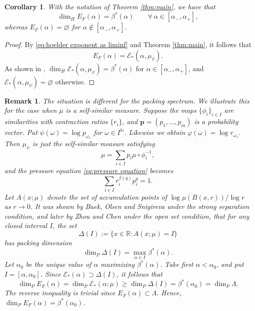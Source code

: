 \documentclass[11pt]{amsart}
\newcommand\NN{\mathbb{N}}
\newcommand\RR{\mathbb{R}}
\newcommand\EE{\mathscr{E}}
\newcommand{\1}{1}
\renewcommand{\emptyset}{\varnothing}
\newtheorem{corollary}[theorem]{Corollary}
\newtheorem{remark}[theorem]{Remark}
\begin{document}
\begin{corollary} \label{cor:Holder-spectrum}
With the notation of Theorem \ref{thm:main}, we have that
\[
\dim_H E_F(\alpha)=\beta^*(\alpha) \qquad \forall\,\alpha\in[\alpha_-,\alpha_+],
\]
whereas $E_F(\alpha)=\emptyset$ for $\alpha\not\in[\alpha_-,\alpha_+]$.
\end{corollary}

\begin{proof}
By \eqref{eq:hoelder exponent as liminf} and Theorem \ref{thm:main}, it follows that
\[
E_F(\alpha)=\EE_*(\alpha,\mu_\psi).
\]
As shown in \cite{JS-2020}, $\dim_H \EE_*(\alpha,\mu_\psi)=\beta^*(\alpha)$ for $\alpha\in[\alpha_-,\alpha_+]$, and $\EE_*(\alpha,\mu_\psi)=\emptyset$ otherwise.
\end{proof}

\begin{remark}
{\rm
The situation is different for the packing spectrum. We illustrate this for the case when $\mu$ is a self-similar measure. Suppose the maps $\{\phi_i\}_{i\in I}$ are similarities with contraction ratios $\{r_i\}$, and $\mathbf{p}=(p_1,\dots,p_m)$ is a probability vector. Put $\psi(\omega)=\log p_{\omega_1}$ for $\omega\in I^\NN$. Likewise we obtain $\varphi(\omega)=\log r_{\omega_1}$. Then $\mu_\psi$ is just the self-similar measure satisfying
\[
\mu=\sum_{i\in I}p_i \mu\circ \phi_i^{-1},
\]
and the pressure equation \eqref{eq:pressure equation} becomes
\[
\sum_{i\in I} r_i^{\beta(q)}p_i^q=1.
\]
Let $A(x;\mu)$ denote the set of accumulation points of $\log \mu(B(x,r))/\log r$ as $r\to 0$. It was shown by Baek, Olsen and Snigireva \cite{BOS} under the strong separation condition, and later by Zhou and Chen \cite{Zhou-Chen} under the open set condition, that for any closed interval $I$, the set
\[
\Delta(I):=\{x\in\RR: A(x;\mu)=I\}
\]
has packing dimension
\[
\dim_P \Delta(I)=\max_{\alpha\in I} \beta^*(\alpha).
\]
Let $\alpha_0$ be the unique value of $\alpha$ maximizing $\beta^*(\alpha)$. Take first $\alpha<\alpha_0$, and put $I=[\alpha,\alpha_0]$. Since $\EE_*(\alpha)\supset \Delta(I)$, it follows that 
\[
\dim_P E_F(\alpha)=\dim_P \EE_*(\alpha;\mu)\geq \dim_P \Delta(I)=\beta^*(\alpha_0)=\dim_P \Lambda.
\]
The reverse inequality is trivial since $E_F(\alpha)\subset \Lambda$. Hence, $\dim_P E_F(\alpha)=\beta^*(\alpha_0)$.

}
\end{remark}
\end{document}
